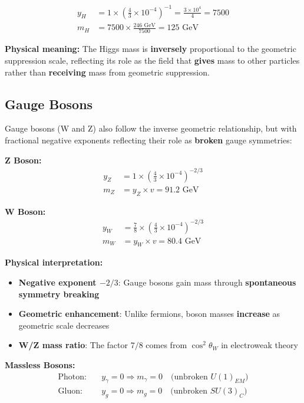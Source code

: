 \documentclass[12pt,a4paper]{article}
\begin{document}
	\begin{align}
		y_H &= 1 \times \left(\frac{4}{3} \times 10^{-4}\right)^{-1} = \frac{3 \times 10^4}{4} = 7500 \\
		m_H &= 7500 \times \frac{246 \text{ GeV}}{7500} = 125 \text{ GeV}
	\end{align}
	
	\textbf{Physical meaning:} The Higgs mass is \textbf{inversely} proportional to the geometric suppression scale, reflecting its role as the field that \textbf{gives} mass to other particles rather than \textbf{receiving} mass from geometric suppression.
	
	\subsection{Gauge Bosons}
	\label{subsec:gauge_bosons}
	
	Gauge bosons (W and Z) also follow the inverse geometric relationship, but with fractional negative exponents reflecting their role as \textbf{broken} gauge symmetries:
	
	\textbf{Z Boson:}
	\begin{align}
		y_Z &= 1 \times \left(\frac{4}{3} \times 10^{-4}\right)^{-2/3} \\
		m_Z &= y_Z \times v = 91.2 \text{ GeV}
	\end{align}
	
	\textbf{W Boson:}
	\begin{align}
		y_W &= \frac{7}{8} \times \left(\frac{4}{3} \times 10^{-4}\right)^{-2/3} \\
		m_W &= y_W \times v = 80.4 \text{ GeV}
	\end{align}
	
	\textbf{Physical interpretation:}
	\begin{itemize}
		\item \textbf{Negative exponent $-2/3$}: Gauge bosons gain mass through \textbf{spontaneous symmetry breaking}
		\item \textbf{Geometric enhancement}: Unlike fermions, boson masses \textbf{increase} as geometric scale decreases
		\item \textbf{W/Z mass ratio}: The factor $7/8$ comes from $\cos^2\theta_W$ in electroweak theory
	\end{itemize}
	
	\textbf{Massless Bosons:}
	\begin{align}
		\text{Photon:} \quad &y_\gamma = 0 \Rightarrow m_\gamma = 0 \quad \text{(unbroken $U(1)_{EM}$)} \\
		\text{Gluon:} \quad &y_g = 0 \Rightarrow m_g = 0 \quad \text{(unbroken $SU(3)_C$)}
	\end{align}
	
\end{document}
